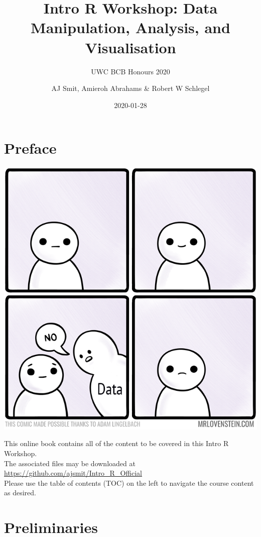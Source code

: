 \documentclass[
]{book}
\title{Intro R Workshop: Data Manipulation, Analysis, and Visualisation}
\subtitle{UWC BCB Honours 2020}
\author{AJ Smit, Amieroh Abrahams \& Robert W Schlegel}
\date{2020-01-28}
\begin{document}
\maketitle

{
\setcounter{tocdepth}{1}
\tableofcontents
}
\hypertarget{preface}{%
\chapter*{Preface}\label{preface}}

\begin{center}\includegraphics[width=1\linewidth]{figures/769_life_finds_a_way} \end{center}

This online book contains all of the content to be covered in this Intro R Workshop.\\
The associated files may be downloaded at \url{https://github.com/ajsmit/Intro_R_Official}\\
Please use the table of contents (TOC) on the left to navigate the course content as desired.

\hypertarget{prelim}{%
\chapter{Preliminaries}\label{prelim}}
\end{document}
